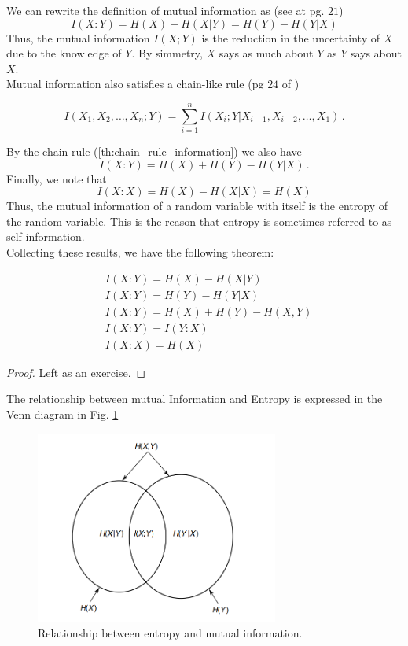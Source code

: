 We can rewrite the definition of mutual information as (see \cite{Cover_and_Thomas} at pg. $21$) 
\begin{equation}
    I(X:Y) = H(X) - H(X|Y) = H(Y) - H(Y|X)
\end{equation}
Thus, the mutual information $I (X; Y )$ is the reduction in the uncertainty
of $X$ due to the knowledge of $Y$. By simmetry, $X$ says as much about $Y$ as $Y$ says about $X$. 
\\Mutual information also satisfies a chain-like rule (pg $24$ of \cite{Cover_and_Thomas})
\begin{theorem}
    \label{th:chain_rule_information}
    \begin{equation*}
        I(X_1, X_2, \dots, X_n ; Y) = \sum_{i=1}^n I(X_i;Y|X_{i-1}, X_{i-2}, \dots, X_1) \, .
    \end{equation*}
\end{theorem}
By the chain rule (\ref{th:chain_rule_information}) we also have
\begin{equation*}
    I(X:Y) = H(X) + H(Y) - H(Y|X) \, .
\end{equation*}
Finally, we note that
\begin{equation}
    I(X:X) = H(X) - H(X|X) = H(X)
\end{equation}
Thus, the mutual information of a random variable with itself is the entropy of the random variable. This is the reason that entropy is sometimes referred to as self-information.
\\Collecting these results, we have the following theorem:
\begin{theorem}
\label{th:Mutual_information_and_entropy}
    \begin{align}
        & I(X:Y) = H(X) - H(X|Y) \\
        & I(X:Y) = H(Y) - H(Y|X) \\
        & I(X:Y) = H(X) + H(Y) - H(X,Y) \\
        & I(X:Y) = I(Y:X) \\
        & I(X:X) = H(X) 
    \end{align}
\end{theorem}
\begin{proof}
    Left as an exercise.
\end{proof}
The relationship between mutual Information and Entropy is expressed in the Venn diagram in Fig. \ref{fig:information_and_entropy}
\begin{figure}[h]
    \centering
    \includegraphics[width=8cm]{img/information_and_entropy.png}
    \caption{Relationship between entropy and mutual information.}
    \label{fig:information_and_entropy}
\end{figure}
